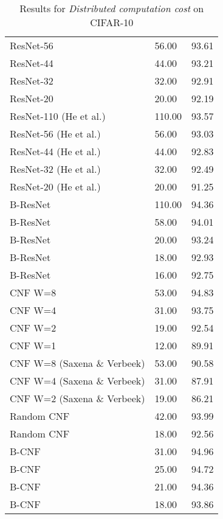 \begin{table}[]
\begin{tabular}{|lll|}
ResNet-56                   & 56.00                       & 93.61       \\
ResNet-44                   & 44.00                       & 93.21       \\
ResNet-32                   & 32.00                       & 92.91       \\
ResNet-20                   & 20.00                       & 92.19       \\ \hline
ResNet-110 (He et al.)      & 110.00                      & 93.57       \\
ResNet-56 (He et al.)       & 56.00                       & 93.03       \\
ResNet-44 (He et al.)       & 44.00                       & 92.83       \\
ResNet-32 (He et al.)       & 32.00                       & 92.49       \\
ResNet-20 (He et al.)       & 20.00                       & 91.25       \\ \hline
B-ResNet                    & 110.00                      & 94.36       \\
B-ResNet                    & 58.00                       & 94.01       \\
B-ResNet                    & 20.00                       & 93.24       \\
B-ResNet                    & 18.00                       & 92.93       \\
B-ResNet                    & 16.00                       & 92.75       \\ \hline
CNF W=8                     & 53.00                       & 94.83       \\
CNF W=4                     & 31.00                       & 93.75       \\
CNF W=2                     & 19.00                       & 92.54       \\
CNF W=1                     & 12.00                       & 89.91       \\ \hline
CNF W=8 (Saxena \& Verbeek) & 53.00                       & 90.58       \\
CNF W=4 (Saxena \& Verbeek) & 31.00                       & 87.91       \\
CNF W=2 (Saxena \& Verbeek) & 19.00                       & 86.21       \\ \hline
Random CNF                  & 42.00                       & 93.99       \\
Random CNF                  & 18.00                       & 92.56       \\ \hline
B-CNF                       & 31.00                       & 94.96       \\
B-CNF                       & 25.00                       & 94.72       \\
B-CNF                       & 21.00                       & 94.36       \\
B-CNF                       & 18.00                       & 93.86       \\ \hline
\end{tabular}
\caption{Results for \textit{Distributed computation cost} on CIFAR-10}
\label{cif10_allpara}
\end{table}